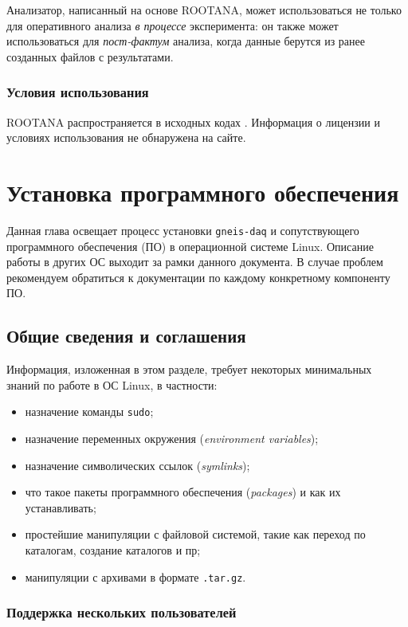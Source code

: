 \documentclass[12pt, a4paper, oneside, onecolumn]{book}
\newcommand{\GD}{{\tt gneis-daq}}
\newcommand{\ROOTANA}{\mbox{ROOTANA}}
\newcommand{\APP}[1]{\mbox{\tt #1}}
\newcommand{\TERM}[1]{{\it #1}}
\begin{document}
Анализатор, написанный на основе \ROOTANA{}, может использоваться не только для оперативного анализа {\it в процессе} эксперимента: он также может использоваться для {\it пост-фактум} анализа, когда данные берутся из ранее созданных файлов с результатами.

\subsection{Условия использования}

\ROOTANA{} распространяется в исходных кодах \cite{RootanaHome}. Информация о лицензии и условиях использования не обнаружена на сайте.

\chapter{Установка программного обеспечения}

Данная глава освещает процесс установки \GD{} и сопутствующего программного обеспечения (ПО) в операционной системе Linux. Описание работы в других ОС выходит за рамки данного документа. В случае проблем рекомендуем обратиться к документации по каждому конкретному компоненту ПО.

\section{Общие сведения и соглашения}

Информация, изложенная в этом разделе, требует некоторых минимальных знаний по работе в ОС Linux, в частности:

\begin{itemize}
\item назначение команды \APP{sudo};
\item назначение переменных окружения (\TERM{environment variables});
\item назначение символических ссылок (\TERM{symlinks});
\item что такое пакеты программного обеспечения (\TERM{packages}) и как их устанавливать;
\item простейшие манипуляции с файловой системой, такие как переход по каталогам, создание каталогов и пр;
\item манипуляции с архивами в формате {\tt .tar.gz}.
\end{itemize}

\subsection{Поддержка нескольких пользователей}
\label{sec_multiuser}
\end{document}

